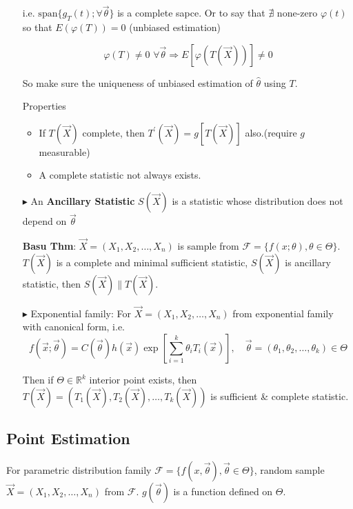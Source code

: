 \documentclass[11pt,a4paper]{ctexart}
\numberwithin{equation}{section}%
\begin{document}
\begin{itemize}
        i.e. $\mathrm{span}\{g_T(t);\forall\vec{\theta}\}$ is a complete sapce. Or to say that $\nexists$ none-zero $\varphi(t)$ so that $E(\varphi(T))=0$ (unbiased estimation)

        \[
            \varphi(T)\neq 0 \,\,\forall \vec{\theta}\Rightarrow E[\varphi(T(\vec{X}))]\neq 0  
        \]

        So make sure the uniqueness of unbiased estimation of $\hat{\theta}$ using $T$.

        Properties
        \begin{itemize}
            \item If $T(\vec{X})$ complete, then $T^\prime(\vec{X})=g[T(\vec{X})]$ also.(require $g$ measurable)

            \item A complete statistic not always exists.
        \end{itemize}
        \item[$\blacktriangleright$]  An \textbf{Ancillary Statistic} $S(\vec{X})$ is a statistic whose distribution does not depend on $\vec{\theta}$
        
        \textbf{Basu Thm}: $\vec{X}=(X_1,X_2,\ldots,X_n)$ is sample from $\mathscr{F}=\{f(x;\theta),\theta\in\Theta\}$. $T(\vec{X})$ is a complete and minimal sufficient statistic, $S(\vec{X})$ is ancillary statistic, then $S(\vec{X})\parallel T(\vec{X})$.

        \item[$\blacktriangleright$] Exponential family: For $\vec{X}=(X_1,X_2,\ldots,X_n)$ from exponential family with canonical form, i.e.
    \[
        f(\vec{x};\vec{\theta})=C(\vec{\theta})h(\vec{x})\exp\left[\sum_{i=1}^k \theta_i T_i(\vec{x})\right] ,\quad \vec{\theta}=(\theta_1,\theta_2,\ldots,\theta_k)\in\Theta
    \]

    Then if $\Theta\in\mathbb{R}^k$ interior point exists, then $T(\vec{X})=(T_1(\vec{X}),T_2(\vec{X}),\ldots,T_k(\vec{X}))$ is sufficient \& complete statistic.


\end{itemize} 




\subsection{Point Estimation}\label{SectionPointEstimation}
    For parametric distribution family $\mathscr{F}=\{f(x,\vec{\theta}),\vec{\theta}\in\Theta\}$, random sample $\vec{X}=(X_1,X_2,\ldots,X_n)$ from $\mathscr{F}$. $g(\vec{\theta})$ is a function defined on $\Theta$. 
\end{document}
